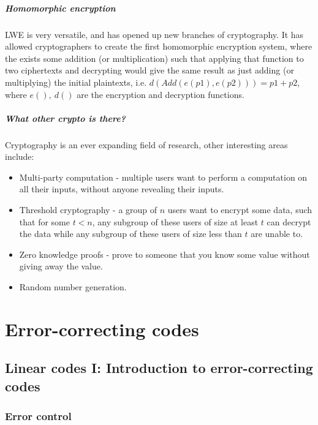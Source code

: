 \documentclass[a4paper, 11pt, openany]{book}
\numberwithin{equation}{section}
\theoremstyle{plain}
\theoremstyle{definition}
\begin{document}
\paragraph{Homomorphic encryption} LWE is very versatile, and has opened up new branches of cryptography. It has allowed cryptographers to create the first homomorphic encryption system, where the exists some addition (or multiplication) such that applying that function to two ciphertexts and decrypting would give the same result as just adding (or multiplying) the initial plaintexts, i.e. $d(Add(e(p1),e(p2))) = p1 + p2$, where $e(),~d()$ are the encryption and decryption functions. 

\paragraph{What other crypto is there?} Cryptography is an ever expanding field of research, other interesting areas include:
\begin{itemize}
	\item Multi-party computation - multiple users want to perform a computation on all their inputs, without anyone revealing their inputs.
	\item Threshold cryptography - a group of $n$ users want to encrypt some data, such that for some $t<n$, any subgroup of these users of size at least $t$ can decrypt the data while any subgroup of these users of size less than $t$ are unable to.
	\item Zero knowledge proofs - prove to someone that you know some value without giving away the value.
	\item Random number generation.
\end{itemize}




\chapter{Error-correcting codes}


\section{Linear codes I: Introduction to error-correcting codes}
\label{sec:21}



\subsection{Error control}
\end{document}
